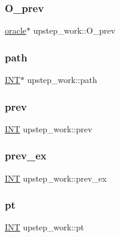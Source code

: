 \subsubsection{\texorpdfstring{O\+\_\+prev}{O\_prev}}
{\footnotesize\ttfamily \mbox{\hyperlink{classoracle}{oracle}}$\ast$ upstep\+\_\+work\+::\+O\+\_\+prev}

\mbox{\label{classupstep__work_af7c174873e3d99d1fd1fdf4b3c28f351}} 
\subsubsection{\texorpdfstring{path}{path}}
{\footnotesize\ttfamily \mbox{\hyperlink{galois_8h_a09fddde158a3a20bd2dcadb609de11dc}{I\+NT}}$\ast$ upstep\+\_\+work\+::path}

\mbox{\label{classupstep__work_a50aad3cf96f11237307499499d2b5015}} 
\subsubsection{\texorpdfstring{prev}{prev}}
{\footnotesize\ttfamily \mbox{\hyperlink{galois_8h_a09fddde158a3a20bd2dcadb609de11dc}{I\+NT}} upstep\+\_\+work\+::prev}

\mbox{\label{classupstep__work_ac7d8499bcc7c811b60d6226ddc97f91c}} 
\subsubsection{\texorpdfstring{prev\+\_\+ex}{prev\_ex}}
{\footnotesize\ttfamily \mbox{\hyperlink{galois_8h_a09fddde158a3a20bd2dcadb609de11dc}{I\+NT}} upstep\+\_\+work\+::prev\+\_\+ex}

\mbox{\label{classupstep__work_a2b04a68048e09c039fce40fa8c99ff93}} 
\subsubsection{\texorpdfstring{pt}{pt}}
{\footnotesize\ttfamily \mbox{\hyperlink{galois_8h_a09fddde158a3a20bd2dcadb609de11dc}{I\+NT}} upstep\+\_\+work\+::pt}

